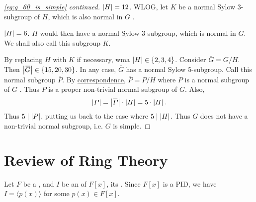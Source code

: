 \documentclass[notoc,notitlepage]{tufte-book}
\begin{document}
\begin{proof}[\cref{eg:g_60_is_simple} continued]
   $\left|H\right| = 12$. WLOG, let $K$ be a normal Sylow $3$-subgroup
  of $H$, which is also normal in $G$ .

  \noindent
   $\left|H\right| = 6$. $H$ would then have a normal Sylow $3$-subgroup,
  which is normal in $G$. We shall also call this subgroup $K$.

  \noindent
  By replacing $H$ with $K$ if necessary, wma $\left| H \right| \in \left\{ 2, 3, 4 \right\}$.
  Consider $\bar{G} = G / H$. Then $\abs{ \bar{G} } \in \left\{ 15, 20, 30 \right\}$.
  In any case, $\bar{G}$ has a normal Sylow $5$-subgroup. Call this normal subgroup 
  $\bar{P}$. By \hyperref[thm:correspondence_theorem]{correspondence}, $\bar{P} = P / H$
  where $P$ is a normal subgroup of $G$ . Thus $P$ is a proper non-trivial normal subgroup of $G$.
  Also,
  \begin{equation*}
    \abs{ P } = \abs{ \bar{P} } \cdot \abs{ H } = 5 \cdot \abs{ H }.
  \end{equation*}
  Thus $5 \mid \left| P \right|$, putting us back to the case where $5 \mid \left| H \right|$.
  Thus $G$ does not have a non-trivial normal subgroup, i.e. $G$ is simple.
\end{proof}


\section{Review of Ring Theory}%
\label{sec:review_of_ring_theory}

Let $F$ be a , and $I$ be an  of $F[x]$, its
. Since $F[x]$ is a PID, we have $I = \langle p(x) \rangle$
for some $p(x) \in F[x]$.
\end{document}
